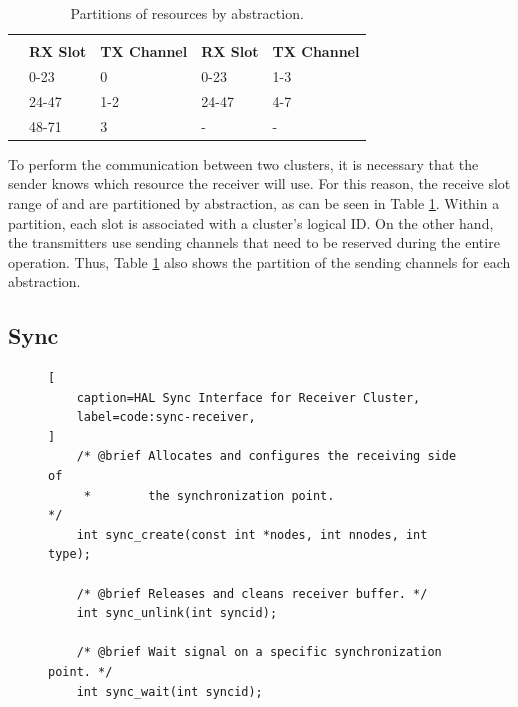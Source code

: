 	\begin{table}[]
		\caption{Partitions of \noc resources by abstraction.}

		\begin{tabular}{l|l|l|l|l|}
			\cline{2-5}
										   & \multicolumn{2}{c|}{\textbf{\cnoc}} & \multicolumn{2}{c|}{\textbf{\dnoc}} \\ \cline{2-5}
										            & \textbf{RX Slot} & \textbf{TX Channel} & \textbf{RX Slot} & \textbf{TX Channel} \\ \hline
			\multicolumn{1}{|l|}{\textbf{\mailbox}} & 0-23             & 0                   & 0-23             & 1-3                 \\ \hline
			\multicolumn{1}{|l|}{\textbf{\portal}}  & 24-47            & 1-2                 & 24-47            & 4-7                 \\ \hline
			\multicolumn{1}{|l|}{\textbf{\sync}}    & 48-71            & 3                   & -                & -                   \\ \hline
		\end{tabular}

		\label{tab.noc-resources}
	\end{table}

	To perform the communication between two clusters, it is necessary that the
	sender knows which resource the receiver will use.
	For this reason, the receive slot range of \cnoc and \dnoc are partitioned
	by abstraction, as can be seen in Table \ref{tab.noc-resources}.
	Within a partition, each slot is associated with a cluster's logical ID.
	On the other hand, the transmitters use sending channels that need to
	be reserved during the entire operation.
	Thus, Table \ref{tab.noc-resources} also shows the partition of the
	sending channels for each abstraction.

	\subsection{Sync}

\begin{figure}[t]
\begin{lstlisting}[
	caption=HAL Sync Interface for Receiver Cluster,
	label=code:sync-receiver,
]
	/* @brief Allocates and configures the receiving side of
	 *        the synchronization point.                     */
	int sync_create(const int *nodes, int nnodes, int type);

	/* @brief Releases and cleans receiver buffer. */
	int sync_unlink(int syncid);

	/* @brief Wait signal on a specific synchronization point. */
	int sync_wait(int syncid);
\end{lstlisting}
\end{figure}


